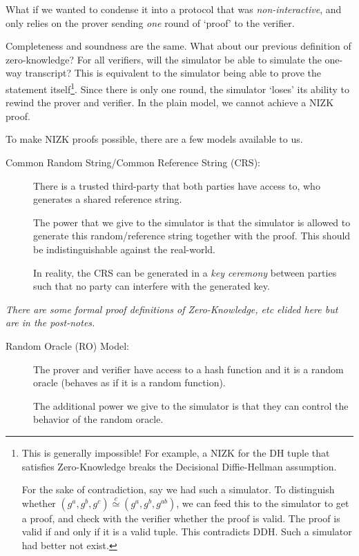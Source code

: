 What if we wanted to condense it into a protocol that was \emph{non-interactive}, and only relies on the prover sending \emph{one} round of `proof' to the verifier.


Completeness and soundness are the same. What about our previous definition of zero-knowledge? For all verifiers, will the simulator be able to simulate the one-way transcript? This is equivalent to the simulator being able to prove the statement itself\footnote{This is generally impossible! For example, a NIZK for the DH tuple that satisfies Zero-Knowledge breaks the Decisional Diffie-Hellman assumption.

    For the sake of contradiction, say we had such a simulator. To distinguish whether $(g^a, g^b, g^c)\overset{c}{\simeq}(g^a, g^b, g^{ab})$, we can feed this to the simulator to get a proof, and check with the verifier whether the proof is valid. The proof is valid if and only if it is a valid tuple. This contradicts DDH. Such a simulator had better not exist. }. Since there is only one round, the simulator `loses' its ability to rewind the prover and verifier. In the plain model, we cannot achieve a NIZK proof.

To make NIZK proofs possible, there are a few models available to us.

\begin{mdframed}[style=mdgreenbox]
    \begin{description}
        \item[Common Random String/Common Reference String (CRS):] There is a trusted third-party that both parties have access to, who generates a shared reference string.

            The power that we give to the simulator is that the simulator is allowed to generate this random/reference string together with the proof. This should be indistinguishable against the real-world.

            In reality, the CRS can be generated in a \emph{key ceremony} between parties such that no party can interfere with the generated key.

    \end{description}
    \emph{There are some formal proof definitions of Zero-Knowledge, etc elided here but are in the post-notes. }
\end{mdframed}

\begin{mdframed}[style=mdgreenbox]
    \begin{description}
        \item[Random Oracle (RO) Model:] The prover and verifier have access to a hash function and it is a random oracle (behaves as if it is a random function).

            The additional power we give to the simulator is that they can control the behavior of the random oracle.
    \end{description}
\end{mdframed}

